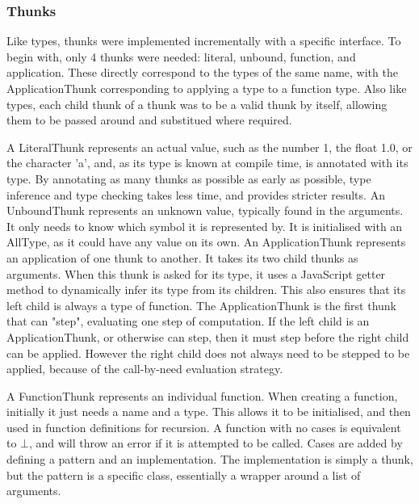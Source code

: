 \subsubsection{Thunks}
Like types, thunks were implemented incrementally with a specific interface. To begin with, only 4 thunks were needed: literal, unbound, function, and application. These directly correspond to the types of the same name, with the ApplicationThunk corresponding to applying a type to a function type. Also like types, each child thunk of a thunk was to be a valid thunk by itself, allowing them to be passed around and substitued where required.

A LiteralThunk represents an actual value, such as the number 1, the float 1.0, or the character 'a', and, as its type is known at compile time, is annotated with its type. By annotating as many thunks as possible as early as possible, type inference and type checking takes less time, and provides stricter results.
An UnboundThunk represents an unknown value, typically found in the arguments. It only needs to know which symbol it is represented by. It is initialised with an AllType, as it could have any value on its own.
An ApplicationThunk represents an application of one thunk to another. It takes its two child thunks as arguments. When this thunk is asked for its type, it uses a JavaScript getter method to dynamically infer its type from its children. This also ensures that its left child is always a type of function. The ApplicationThunk is the first thunk that can "step", evaluating one step of computation. If the left child is an ApplicationThunk, or otherwise can step, then it must step before the right child can be applied. However the right child does not always need to be stepped to be applied, because of the call-by-need evaluation strategy.

A FunctionThunk represents an individual function. When creating a function, initially it just needs a name and a type. This allows it to be initialised, and then used in function definitions for recursion. A function with no cases is equivalent to $\bot$, and will throw an error if it is attempted to be called. Cases are added by defining a pattern and an implementation. The implementation is simply a thunk, but the pattern is a specific class, essentially a wrapper around a list of arguments.

